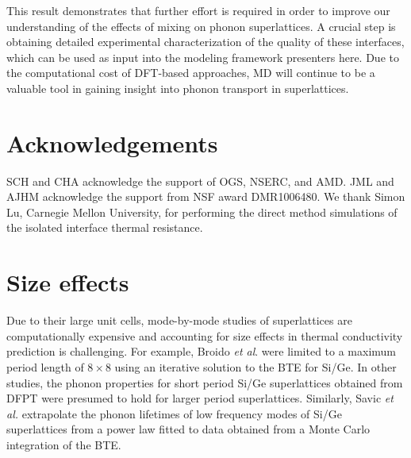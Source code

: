\documentclass[aps,prb,preprint,preprintnumbers,amsmath,amssymb,floatfix,superscriptaddress]{revtex4}
\begin{document}
This result demonstrates that further effort is required in order to improve our understanding of the effects of mixing on phonon superlattices. A crucial step is obtaining detailed experimental characterization of the quality of these interfaces, which can be used as input into the modeling framework presenters here. Due to the computational cost of DFT-based approaches, MD will continue to be a valuable tool in gaining insight into phonon transport in superlattices. 



\section{Acknowledgements}
SCH and CHA acknowledge the support of OGS, NSERC, and AMD. JML and AJHM acknowledge the support from NSF award DMR1006480. We thank Simon Lu, Carnegie Mellon University, for performing the direct method simulations of the isolated interface thermal resistance.

\newpage
\appendix
\section{Size effects}\label{app:size effects}
Due to their large unit cells, mode-by-mode studies of superlattices are computationally expensive and accounting for size effects in thermal conductivity prediction is challenging. For example, Broido \textit{et al}. were limited to a maximum period length of $8\times 8$ using an iterative solution to the BTE for Si/Ge.\cite {PhysRevB.70.081310} In other studies, the phonon properties for short period Si/Ge superlattices obtained from DFPT were presumed to hold for larger period superlattices.\cite{Luckyanova16112012, doi:10.1021/nl202186y} Similarly, Savic \textit{et al.} extrapolate the phonon lifetimes of low frequency modes of Si/Ge superlattices from a power law fitted to data obtained from a Monte Carlo integration of the BTE.\cite{savic:073113} 
\end{document}
